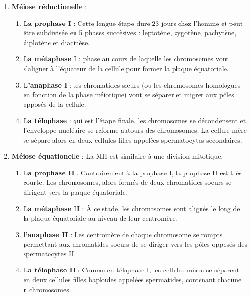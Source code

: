 \documentclass[12pt,twoside]{reedthesis}
\providecommand{\tightlist}{%
  \setlength{\itemsep}{0pt}\setlength{\parskip}{0pt}}
\theoremstyle{definition}
\theoremstyle{definition}
\theoremstyle{remark}
\begin{document}
  \begin{enumerate}
  \def\labelenumi{\arabic{enumi}.}
  \tightlist
  \item
    \textbf{Méiose réductionelle} :
  
    \begin{enumerate}
    \def\labelenumii{\alph{enumii}.}
    \tightlist
    \item
      \textbf{La prophase I} : Cette longue étape dure 23 jours chez
      l'homme et peut être subdivisée en 5 phases succèsives : leptotène,
      zygotène, pachytène, diplotène et diacinèse.
    \item
      \textbf{La métaphase I} : phase au cours de laquelle les chromosomes
      vont s'aligner à l'équateur de la cellule pour former la plaque
      équatoriale.
    \item
      \textbf{L'anaphase I} : les chromatides sœurs (ou les chromosomes
      homologues en fonction de la phase méiotique) vont se séparer et
      migrer aux pôles opposés de la cellule.\\
    \item
      \textbf{La télophase} : qui est l'étape finale, les chromosomes se
      décondensent et l'enveloppe nucléaire se reforme autours des
      chromosomes. La cellule mère se sépare alors en deux cellules filles
      appelées spermatocytes secondaires.\\
    \end{enumerate}
  \item
    \textbf{Méiose équationelle} : La MII est similaire à une division
    mitotique,
  
    \begin{enumerate}
    \def\labelenumii{\alph{enumii}.}
    \tightlist
    \item
      \textbf{La prophase II} : Contrairement à la prophase I, la prophase
      II est très courte. Les chromosomes, alors formés de deux
      chromatides soeurs se dirigent vers la plaque équatoriale.\\
    \item
      \textbf{La métaphase II} : À ce stade, les chromosomes sont alignés
      le long de la plaque équatoriale au niveau de leur centromère.\\
    \item
      \textbf{l'anaphase II} : Les centromère de chaque chromosome se
      rompts permettant aux chromatides soeurs de se diriger vers les
      pôles opposés des spermatocytes II.\\
    \item
      \textbf{La télophase II} : Comme en télophase I, les cellules mères
      se séparent en deux cellules filles haploïdes appelées spermatides,
      contenant chacune n chromosomes.
    \end{enumerate}
  \end{enumerate}
  
\end{document}
